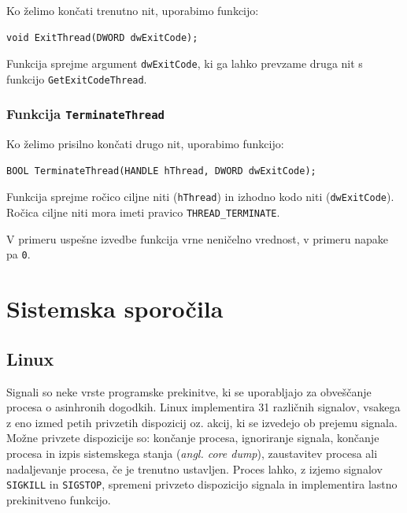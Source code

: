 \documentclass[a4paper,12pt,openright]{book}
\begin{document}
Ko želimo končati trenutno nit, uporabimo funkcijo:
\begin{lstlisting}[style=func]
 void ExitThread(DWORD dwExitCode);
\end{lstlisting}

Funkcija sprejme argument \texttt{dwExitCode}, ki ga lahko prevzame druga nit s funkcijo \texttt{GetExitCodeThread}.

\subsubsection{Funkcija \texttt{TerminateThread}}

Ko želimo prisilno končati drugo nit, uporabimo funkcijo:
\begin{lstlisting}[style=func]
 BOOL TerminateThread(HANDLE hThread, DWORD dwExitCode);
\end{lstlisting}

Funkcija sprejme ročico ciljne niti (\texttt{hThread}) in izhodno kodo niti (\texttt{dwExit\-Code}).
Ročica ciljne niti mora imeti pravico \texttt{THREAD\_TERMINATE}.

V primeru uspešne izvedbe funkcija vrne neničelno vrednost, v primeru napake pa \texttt{0}.

\section{Sistemska sporočila}

\subsection{Linux}

Signali so neke vrste programske prekinitve, ki se uporabljajo za obveščanje procesa o asinhronih dogodkih. %
Linux implementira 31 različnih signalov, vsakega z eno izmed petih privzetih dispozicij oz. akcij, ki se izvedejo ob prejemu signala.
Možne privzete dispozicije so: končanje procesa, ignoriranje signala, končanje procesa in izpis sistemskega stanja (\textit{angl. core dump}), zaustavitev procesa ali nadaljevanje procesa, če je trenutno ustavljen.
Proces lahko, z izjemo signalov \texttt{SIGKILL} in \texttt{SIGSTOP}, spremeni privzeto dispozicijo signala in implementira lastno prekinitveno funkcijo.
\end{document}
